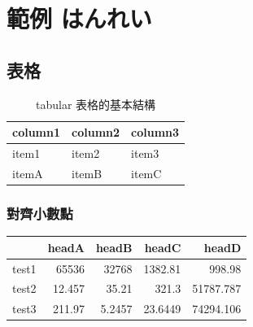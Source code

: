 \chapter{範例 はんれい}\label{example}

\section{表格}
\begin{table}[h]
   \centering
   \caption{tabular 表格的基本結構}\label{booktabs_1}
		\begin{tabular}[t]{lll}
		\hline
		column1 & column2 & column3 \\
		\hline
		item1   & item2   & item3 \\
		itemA   & itemB   & itemC \\
		\hline
		\end{tabular}
\end{table}
\clearpage

\subsection{對齊小數點}
\begin{tabular}{lD{.}{.}{3}D{.}{.}{3}D{.}{.}{3}D{.}{.}{3}}
   \toprule
         & headA & headB & headC & headD \\
   \midrule
   test1 & 65536  & 32768 & 1382.81 & 998.98 \\
   test2 & 12.457 & 35.21 & 321.3   & 51787.787 \\
   test3 & 211.97 & 5.2457& 23.6449 & 74294.106 \\
   \bottomrule
\end{tabular}
\clearpage

